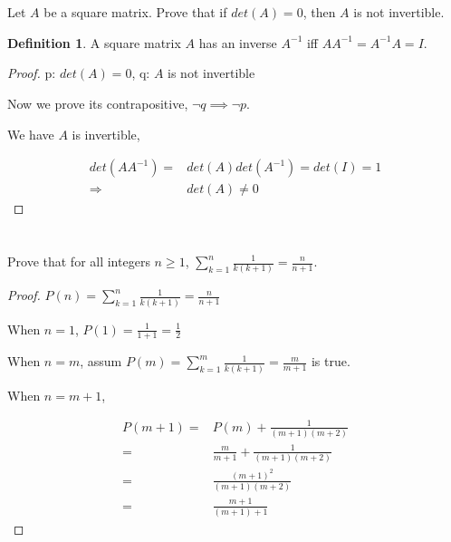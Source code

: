 \documentclass{article}
\theoremstyle{definition} %
\newtheorem{definition}{Definition}[section]
\begin{document}
\section{}
Let $A$ be a square matrix. Prove that if $det(A)=0$, then $A$ is not invertible.


\begin{definition}
    A square matrix $A$ has an inverse $A^{-1}$ iff $AA^{-1} = A^{-1}A=I$.
\end{definition}

\begin{proof}

p: $det(A)=0$, q: $A$ is not invertible

Now we prove its contrapositive, $\neg q\implies\neg p$.

We have $A$ is invertible,

\begin{align*}
    det(AA^{-1}) = &det(A) det(A^{-1}) = det(I) = 1\\
    \Rightarrow \quad &det(A) \neq 0
\end{align*}

\end{proof}

\section{}
Prove that for all integers $n\ge 1$, $\sum^n_{k=1}\frac{1}{k(k+1)}=\frac{n}{n+1}$.

\begin{proof}
$P(n) = \sum^n_{k=1}\frac{1}{k(k+1)}=\frac{n}{n+1}$

When $n=1$, $P(1) = \frac{1}{1+1} = \frac{1}{2}$

When $n=m$, assum $P(m) = \sum^m_{k=1}\frac{1}{k(k+1)}=\frac{m}{m+1}$ is true.

When $n=m+1$,

\begin{align*}
    P(m+1) =& P(m) + \frac{1}{(m+1)(m+2)}\\
    =& \frac{m}{m+1} + \frac{1}{(m+1)(m+2)}\\
    =& \frac{(m+1)^2}{(m+1)(m+2)}\\
    =& \frac{m+1}{(m+1)+1}
\end{align*}

\end{proof}

\section{}
\end{document}
